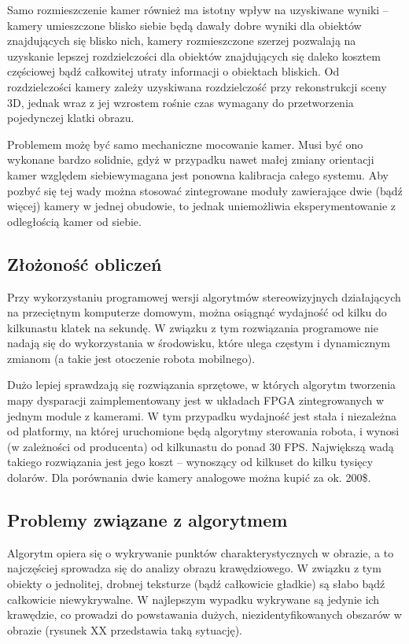 Samo rozmieszczenie kamer również ma istotny wpływ na uzyskiwane wyniki -- kamery
umieszczone blisko siebie będą dawały dobre wyniki dla obiektów znajdujących się
blisko nich, kamery rozmieszczone szerzej pozwalają na uzyskanie lepszej rozdzielczości
dla obiektów znajdujących się daleko kosztem częściowej bądź całkowitej utraty
informacji o obiektach bliskich. Od rozdzielczości kamery zależy uzyskiwana rozdzielczość
przy rekonstrukcji sceny 3D, jednak wraz z jej wzrostem rośnie czas wymagany do
przetworzenia pojedynczej klatki obrazu.

Problemem możę być samo mechaniczne mocowanie kamer.
Musi być ono wykonane bardzo solidnie, gdyż w przypadku nawet małej zmiany orientacji
kamer względem siebiewymagana jest ponowna kalibracja całego systemu. Aby pozbyć
się tej wady można stosować zintegrowane moduły zawierające dwie (bądź więcej)
kamery w jednej obudowie, to jednak uniemożliwia eksperymentowanie z odległością
kamer od siebie.

\subsection{Złożoność obliczeń}

\cite{4670774} \cite{Hirschmuller:2008:SPS:1340087.1340245}

Przy wykorzystaniu programowej wersji algorytmów stereowizyjnych działających
na przeciętnym komputerze domowym, można osiągnąć wydajność od kilku do kilkunastu
klatek na sekundę. W związku z tym rozwiązania programowe
nie nadają się do wykorzystania w środowisku, które ulega częstym i dynamicznym
zmianom (a takie jest otoczenie robota mobilnego).

Dużo lepiej sprawdzają się rozwiązania sprzętowe, w których algorytm tworzenia
mapy dysparacji zaimplementowany jest w układach FPGA zintegrowanych w jednym
module z kamerami. W tym przypadku wydajność jest stała i niezależna od platformy,
na której uruchomione będą algorytmy sterowania robota, i wynosi (w zależności
od producenta) od kilkunastu do ponad 30 FPS. Największą wadą takiego rozwiązania
jest jego koszt -- wynoszący od kilkuset do kilku tysięcy dolarów. Dla porównania
dwie kamery analogowe można kupić za ok. 200\$.

\subsection{Problemy związane z algorytmem}

Algorytm opiera się o wykrywanie punktów charakterystycznych w obrazie, a to najczęściej
sprowadza się do analizy obrazu krawędziowego. W związku z tym obiekty o jednolitej,
drobnej teksturze (bądź całkowicie gładkie) są słabo bądź całkowicie niewykrywalne.
W najlepszym wypadku wykrywane są jedynie ich krawędzie, co prowadzi do powstawania
dużych, niezidentyfikowanych obszarów w obrazie (rysunek XX przedstawia taką sytuację).


